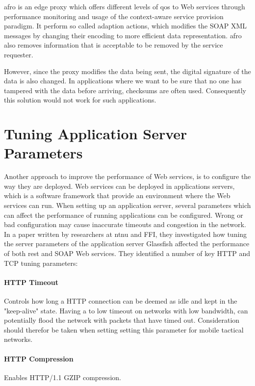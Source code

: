 \gls{afro} is an edge proxy which offers different levels of \gls{qos} to Web
services through performance monitoring and usage of the context-aware
service provision paradigm\cite{ist-090}. It perform so called adaption actions, which
modifies the SOAP XML messages by changing their encoding to more efficient data
representation. \gls{afro} also removes information that is acceptable to be removed by
the service requester.

However, since the proxy modifies the data being sent, the digital signature of
the data is also changed. In applications where we want to be sure that no one
has tampered with the data before arriving, checksums are often used.
Consequently this solution would not work for such applications.


\section{Tuning Application Server Parameters}

 Another approach to improve the performance of Web services, is to configure
 the way they are deployed. Web services can be deployed in applications
 servers, which is a software framework that provide an environment where the
 Web services can run. When setting up an application server, several parameters
 which can affect the performance of running applications can be
 configured. Wrong or bad configuration may cause inaccurate timeouts and
 congestion in the network. In a paper written by researchers at \gls{ntnu} and
 FFI\cite{johnsen-bloebaum-recommendations-web-services-tactical-domain}, they
 investigated how tuning the server parameters of the application server
 Glassfish affected the performance of both \gls{rest} and SOAP Web services.
 They identified a number of key HTTP and TCP tuning parameters:

\paragraph{HTTP Timeout} Controls how long a HTTP connection can be deemed as
idle and kept in the "keep-alive" state. Having a to low timeout on networks
with low bandwidth, can potentially flood the network with packets that have
timed out. Consideration should therefor be taken when setting setting this
parameter for mobile tactical networks.

\paragraph{HTTP Compression} Enables HTTP/1.1 GZIP compression.

